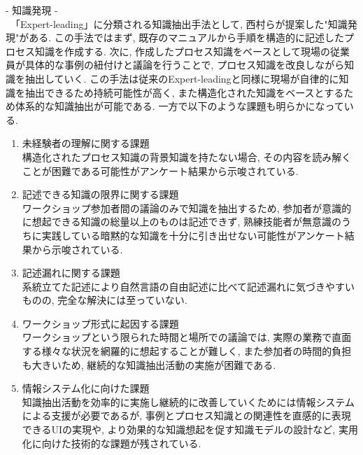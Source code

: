 - 知識発現 -\\
　「Expert-leading」に分類される知識抽出手法として, 西村らが提案した"知識発現"\cite{Nishimura2017}がある. この手法ではまず, 既存のマニュアルから手順を構造的に記述したプロセス知識を作成する. 次に, 作成したプロセス知識をベースとして現場の従業員が具体的な事例の紐付けと議論を行うことで, プロセス知識を改良しながら知識を抽出していく. この手法は従来のExpert-leadingと同様に現場が自律的に知識を抽出できるため持続可能性が高く, また構造化された知識をベースとするため体系的な知識抽出が可能である. 一方で以下のような課題も明らかになっている. 
\begin{enumerate}
    \item 未経験者の理解に関する課題\\
    構造化されたプロセス知識の背景知識を持たない場合, その内容を読み解くことが困難である可能性がアンケート結果から示唆されている.\\
    
    \item 記述できる知識の限界に関する課題\\
    ワークショップ参加者間の議論のみで知識を抽出するため, 参加者が意識的に想起できる知識の総量以上のものは記述できず, 熟練技能者が無意識のうちに実践している暗黙的な知識を十分に引き出せない可能性がアンケート結果から示唆されている.\\
    
    \item 記述漏れに関する課題\\
    系統立てた記述により自然言語の自由記述に比べて記述漏れに気づきやすいものの, 完全な解決には至っていない.\\
    
    \item ワークショップ形式に起因する課題\\
    ワークショップという限られた時間と場所での議論では, 実際の業務で直面する様々な状況を網羅的に想起することが難しく, また参加者の時間的負担も大きいため, 継続的な知識抽出活動の実施が困難である.\\
    
    \item 情報システム化に向けた課題\\
    知識抽出活動を効率的に実施し継続的に改善していくためには情報システムによる支援が必要であるが, 事例とプロセス知識との関連性を直感的に表現できるUIの実現や, より効果的な知識想起を促す知識モデルの設計など, 実用化に向けた技術的な課題が残されている.\\
\end{enumerate}

